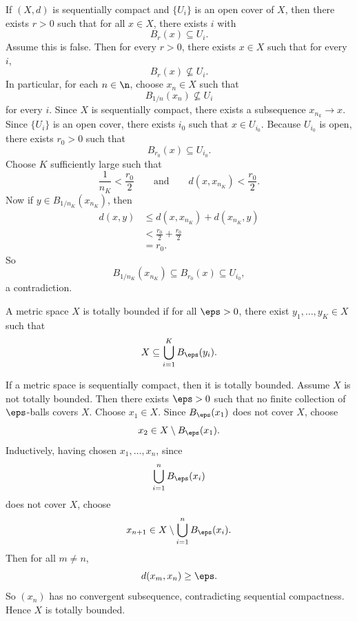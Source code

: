 

\begin{lemma}{
	If $(X,d)$ is sequentially compact and $\{U_i\}$ is an open cover of $X$, then there exists $r > 0$ such that for all $x\in X$, there exists $i$ with
	\[
		B_r(x)\subseteq U_i.
	\]
}
	Assume this is false.
	Then for every $r > 0$, there exists $x\in X$ such that for every $i$,
	\[
		B_r(x)\nsubseteq U_i.
	\]
	In particular, for each $n\in\n$, choose $x_n\in X$ such that
	\[
		B_{1/n}(x_n)\nsubseteq U_i
	\]
	for every $i$.
	Since $X$ is sequentially compact, there exists a subsequence $x_{n_k}\to x$.
	Since $\{U_i\}$ is an open cover, there exists $i_0$ such that $x\in U_{i_0}$.
	Because $U_{i_0}$ is open, there exists $r_0 > 0$ such that
	\[
		B_{r_0}(x)\subseteq U_{i_0}.
	\]
	Choose $K$ sufficiently large such that
	\[
		\frac{1}{n_K}<\frac{r_0}{2}
		\qquad\text{and}\qquad
		d(x,x_{n_K})<\frac{r_0}{2}.
	\]
	Now if $y\in B_{1/n_K}(x_{n_K})$, then
	\begin{align*}
		d(x,y)
		&\leq d(x,x_{n_K}) + d(x_{n_K},y)\\
		&< \frac{r_0}{2} + \frac{r_0}{2}\\
		&= r_0.
	\end{align*}
	So
	\[
		B_{1/n_K}(x_{n_K})\subseteq B_{r_0}(x)\subseteq U_{i_0},
	\]
	a contradiction.
\end{lemma}

\begin{definition}
	A metric space $X$ is totally bounded if for all $\eps > 0$, there exist $y_1,\ldots,y_K\in X$ such that
	\[
		X\subseteq \bigcup_{i=1}^K B_\eps(y_i).
	\]
\end{definition}

\begin{lemma}{
	If a metric space is sequentially compact, then it is totally bounded.
}
	Assume $X$ is not totally bounded.
	Then there exists $\eps > 0$ such that no finite collection of $\eps$-balls covers $X$.
	Choose $x_1\in X$.
	Since $B_\eps(x_1)$ does not cover $X$, choose
	\[
		x_2\in X\setminus B_\eps(x_1).
	\]
	Inductively, having chosen $x_1,\ldots,x_n$, since
	\[
		\bigcup_{i=1}^n B_\eps(x_i)
	\]
	does not cover $X$, choose
	\[
		x_{n+1}\in X\setminus \bigcup_{i=1}^n B_\eps(x_i).
	\]
	Then for all $m\neq n$,
	\[
		d(x_m,x_n)\geq \eps.
	\]
	So $(x_n)$ has no convergent subsequence, contradicting sequential compactness.
	Hence $X$ is totally bounded.
\end{lemma}

